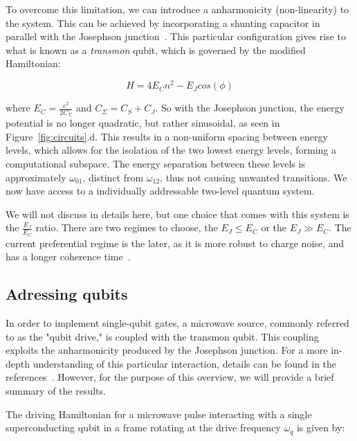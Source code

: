 \documentclass[
  journal=largetwo,
  year=2023,
]{cup-journal}
\begin{document}
To overcome this limitation, we can introduce a anharmonicity (non-linearity) to the system. This can be achieved by incorporating a shunting capacitor in parallel with the Josephson junction~\autocite{josephson_1962_possible}\autocite{josephson_1964_coupled}. This particular configuration gives rise to what is known as a {\it transmon} qubit, which is governed by the modified Hamiltonian:

\begin{equation}
  H = 4E_C n^2 - E_J cos(\phi)
\end{equation}

\noindent where \(E_C = \frac{e^2}{2C_\Sigma}\) and \(C_\Sigma = C_S+C_J\). So with the Josephson junction, the energy potential is no longer quadratic, but rather sinusoidal, as seen in Figure~\ref{fig:circuits}.d. This results in a non-uniform spacing between energy levels, which allows for the isolation of the two lowest energy levels, forming a computational subspace. The energy separation between these levels is approximately \(\omega_{01}\), distinct from \(\omega_{12}\), thus not causing unwanted transitions. We now have access to a individually addressable two-level quantum system.

We will not discuss in details here, but one choice that comes with this system is the \(\frac{E_J}{E_C}\) ratio. There are two regimes to choose, the \(E_J \leq E_C\) or the \(E_J \gg E_C\). The current preferential regime is the later, as it is more robust to charge noise, and has a longer coherence time~\autocite{krantz_2019_a}.

\subsection{Adressing qubits}

In order to implement single-qubit gates, a microwave source, commonly referred to as the "qubit drive," is coupled with the transmon qubit. This coupling exploits the anharmonicity produced by the Josephson junction. For a more in-depth understanding of this particular interaction, details can be found in the references~\autocite{girvin_circuit}\autocite{krantz_2019_a}\autocite{gustavsson_2012_driven}\autocite{bertet_2006_parametric}. However, for the purpose of this overview, we will provide a brief summary of the results.

The driving Hamiltonian for a microwave pulse interacting with a  single superconducting qubit in a frame rotating at the drive frequency \(\omega_q\) is given by:
\end{document}
